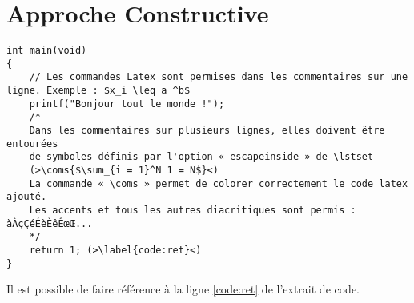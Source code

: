 \section{Approche Constructive}

\begin{lstlisting}[caption={Un programme tout simple}]
int main(void)
{
    // Les commandes Latex sont permises dans les commentaires sur une ligne. Exemple : $x_i \leq a ^b$
    printf("Bonjour tout le monde !");
    /*
    Dans les commentaires sur plusieurs lignes, elles doivent être entourées
    de symboles définis par l'option « escapeinside » de \lstset
    (>\coms{$\sum_{i = 1}^N 1 = N$}<)
    La commande « \coms » permet de colorer correctement le code latex ajouté.
    Les accents et tous les autres diacritiques sont permis : àÀçÇéÉèÈêÊœŒ...
    */
    return 1; (>\label{code:ret}<)
}
\end{lstlisting}

Il est possible de faire référence à la ligne \ref{code:ret} de l'extrait de code.


